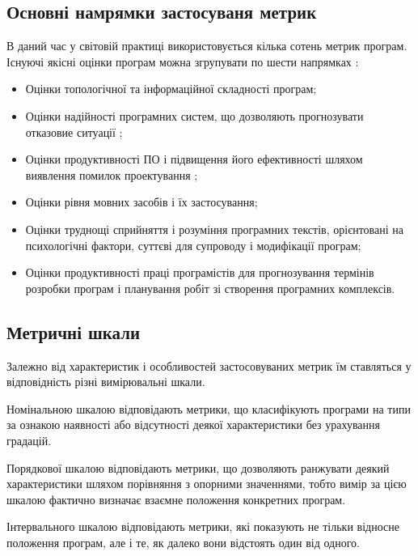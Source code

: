 \subsection{Основні намрямки застосуваня метрик}
\label{2section:id4}
В даний час у світовій практиці використовується кілька сотень метрик програм. Існуючі якісні оцінки програм можна згрупувати по шести напрямках :
\begin{itemize}
\item {} 
Оцінки топологічної та інформаційної складності програм;

\item {} 
Оцінки надійності програмних систем, що дозволяють прогнозувати отказовие ситуації ;

\item {} 
Оцінки продуктивності ПО і підвищення його ефективності шляхом виявлення помилок проектування ;

\item {} 
Оцінки рівня мовних засобів і їх застосування;

\item {} 
Оцінки труднощі сприйняття і розуміння програмних текстів, орієнтовані на психологічні фактори, суттєві для супроводу і модифікації програм;

\item {} 
Оцінки продуктивності праці програмістів для прогнозування термінів розробки програм і планування робіт зі створення програмних комплексів.

\end{itemize}


\subsection{Метричні шкали}
\label{2section:id5}
Залежно від характеристик і особливостей застосовуваних метрик їм ставляться у відповідність різні вимірювальні шкали.

Номінальною шкалою відповідають метрики, що класифікують програми на типи за ознакою наявності або відсутності деякої характеристики без урахування градацій.

Порядкової шкалою відповідають метрики, що дозволяють ранжувати деякий характеристики шляхом порівняння з опорними значеннями, тобто вимір за цією шкалою фактично визначає взаємне положення конкретних програм.

Інтервального шкалою відповідають метрики, які показують не тільки відносне положення програм, але і те, як далеко вони відстоять один від одного.

